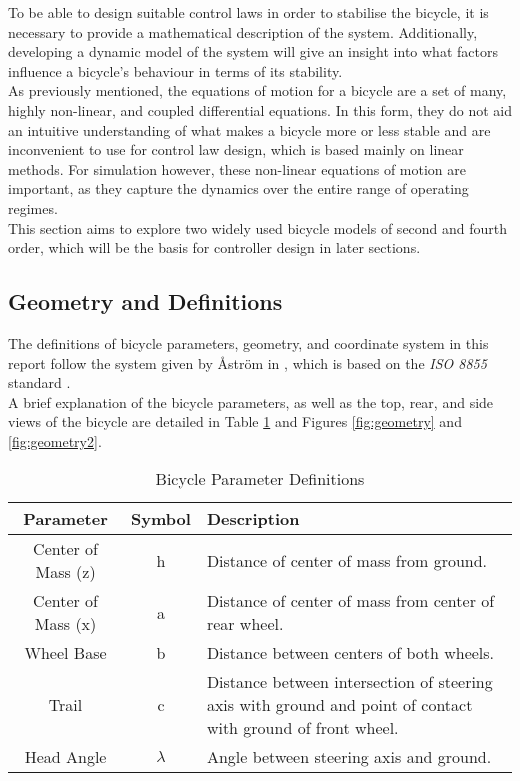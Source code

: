 To be able to design suitable control laws in order to stabilise the bicycle, it is necessary to provide a mathematical description of the system. Additionally, developing a dynamic model of the system will give an insight into what factors influence a bicycle's behaviour in terms of its stability. \\

As previously mentioned, the equations of motion for a bicycle are a set of many, highly non-linear, and coupled differential equations. In this form, they do not aid an intuitive understanding of what makes a bicycle more or less stable and are inconvenient to use for control law design, which is based mainly on linear methods. For simulation however, these non-linear equations of motion are important, as they capture the dynamics over the entire range of operating regimes. \\

This section aims to explore two widely used bicycle models of second and fourth order, which will be the basis for controller design in later sections.

\subsection{Geometry and Definitions}
The definitions of bicycle parameters, geometry, and coordinate system in this report follow the system given by {\AA}str{\"o}m in \cite{astrom}, which is based on the \textit{ISO 8855} standard \cite{iso}. \\

A brief explanation of the bicycle parameters, as well as the top, rear, and side views of the bicycle are detailed in Table \ref{table:params} and Figures \ref{fig:geometry} and \ref{fig:geometry2}. \\

\vspace{1cm}

\begin{table}[h]
	\centering
 	\begin{tabular}[t]{c c p{10cm}} 
	\toprule
	Parameter & Symbol & Description \\
 	\midrule
 	Center of Mass (z) & h & Distance of center of mass from ground.\\ 
 	Center of Mass (x) & a & Distance of center of mass from center of rear wheel.\\
 	Wheel Base & b & Distance between centers of both wheels.\\
 	Trail & c & Distance between intersection of steering axis with ground and point of contact with ground of front wheel.\\
 	Head Angle & $\lambda$ & Angle between steering axis and ground.\\
 	\bottomrule
	\end{tabular}
 	\caption{Bicycle Parameter Definitions}
	\label{table:params}
\end{table}

